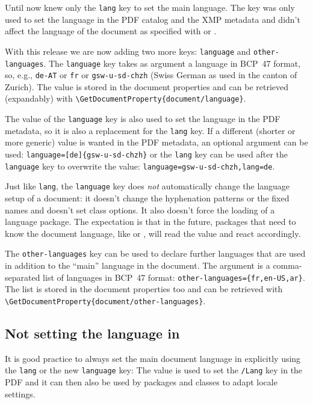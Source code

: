 \documentclass{ltnews}
\begin{document}
Until now  knew only the \texttt{lang} key to set
the main language.  The key was only used to set the language in the
PDF catalog and the XMP metadata and didn't affect the language of the
document as specified with  or .

With this release we are now adding two more keys: \texttt{language}
and \texttt{other-languages}. The \texttt{language} key takes as
argument a language in BCP~47 format, so, e.g., \texttt{de-AT} or
\texttt{fr} or \texttt{gsw-u-sd-chzh} (Swiss German as used in the
canton of Zurich). The value is stored in the document properties and
can be retrieved (expandably) with
\verb+\GetDocumentProperty{document/language}+.

The value of the \texttt{language} key is also used to set the
language in the PDF metadata, so it is also a replacement for the
\texttt{lang} key.  If a different (shorter or more generic) value is
wanted in the PDF metadata, an optional argument can be used:
\verb+language=[de]{gsw-u-sd-chzh}+ or the \texttt{lang} key can be
used after the \texttt{language} key to overwrite the value:
\verb+language=gsw-u-sd-chzh,lang=de+.

Just like \texttt{lang}, the \texttt{language} key does \emph{not}
automatically change the language setup of a document: it doesn't
change the hyphenation patterns or the fixed names and doesn't set class
options. It also doesn't force the loading of a language package.
The expectation is that in the future, packages that need to know the
document language, like  or , will read
the value and react accordingly.

The \texttt{other-languages} key can be used to declare further
languages that are used in addition to the \enquote{main} language in
the document. The argument is a comma-separated list of languages in BCP~47
format: \verb+other-languages={fr,en-US,ar}+. The list is stored in
the document properties too and can be retrieved with
\verb+\GetDocumentProperty{document/other-languages}+.


\subsection{Not setting the language in }

It is good practice to always set the main document language in
 explicitly using the \texttt{lang} or the new
\texttt{language} key: The value is used to set the \texttt{/Lang} key in the
PDF and it can then also be used by packages and classes to adapt
locale settings.
 
\end{document}
